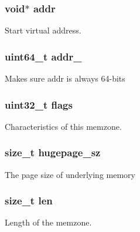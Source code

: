 \subsubsection[{addr}]{\setlength{\rightskip}{0pt plus 5cm}void$\ast$ addr}\label{structrte__memzone_ae5bd6c22dbf0f6b5b0ae0233f8eb3704}
Start virtual address. \hypertarget{structrte__memzone_a684abacaaf679b13b2ccec687a763b17}{}
\subsubsection[{addr\+\_\+64}]{\setlength{\rightskip}{0pt plus 5cm}uint64\+\_\+t addr\+\_}\label{structrte__memzone_a684abacaaf679b13b2ccec687a763b17}
Makes sure addr is always 64-\/bits \hypertarget{structrte__memzone_a773b39d480759f67926cb18ae2219281}{}
\subsubsection[{flags}]{\setlength{\rightskip}{0pt plus 5cm}uint32\+\_\+t flags}\label{structrte__memzone_a773b39d480759f67926cb18ae2219281}
Characteristics of this memzone. \hypertarget{structrte__memzone_a0e9113d25bb493add104f3b95844aaf5}{}
\subsubsection[{hugepage\+\_\+sz}]{\setlength{\rightskip}{0pt plus 5cm}size\+\_\+t hugepage\+\_\+sz}\label{structrte__memzone_a0e9113d25bb493add104f3b95844aaf5}
The page size of underlying memory \hypertarget{structrte__memzone_a7360b55975153b822efc5217b7734e6a}{}
\subsubsection[{len}]{\setlength{\rightskip}{0pt plus 5cm}size\+\_\+t len}\label{structrte__memzone_a7360b55975153b822efc5217b7734e6a}
Length of the memzone. \hypertarget{structrte__memzone_a1a1c0270e433d8ce66b34d3bd7c713fd}{}
